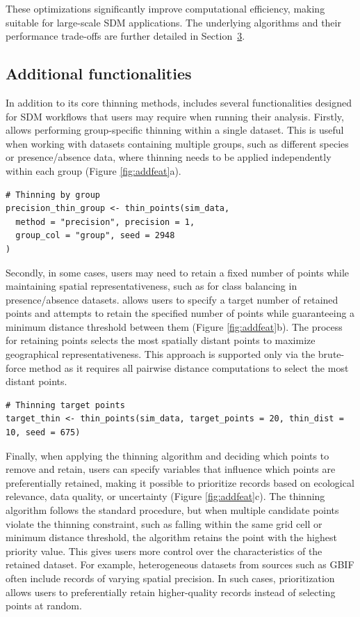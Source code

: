These optimizations significantly improve computational efficiency, making  suitable for large-scale SDM applications. The underlying algorithms and their performance trade-offs are further detailed in Section~\hyperref[modifiedthinning]{3}.

\subsection{Additional functionalities}\label{additional-functionalities}

In addition to its core thinning methods,  includes several functionalities designed for SDM workflows that users may require when running their analysis. Firstly,  allows performing group-specific thinning within a single dataset. This is useful when working with datasets containing multiple groups, such as different species or presence/absence data, where thinning needs to be applied independently within each group (Figure \ref{fig:addfeat}a).

\begin{verbatim}
# Thinning by group
precision_thin_group <- thin_points(sim_data,
  method = "precision", precision = 1,
  group_col = "group", seed = 2948
)
\end{verbatim}

Secondly, in some cases, users may need to retain a fixed number of points while maintaining spatial representativeness, such as for class balancing in presence/absence datasets.  allows users to specify a target number of retained points and attempts to retain the specified number of points while guaranteeing a minimum distance threshold between them (Figure \ref{fig:addfeat}b). The process for retaining points selects the most spatially distant points to maximize geographical representativeness. This approach is supported only via the brute-force method as it requires all pairwise distance computations to select the most distant points.

\begin{verbatim}
# Thinning target points
target_thin <- thin_points(sim_data, target_points = 20, thin_dist = 10, seed = 675)
\end{verbatim}

Finally, when applying the thinning algorithm and deciding which points to remove and retain, users can specify variables that influence which points are preferentially retained, making it possible to prioritize records based on ecological relevance, data quality, or uncertainty (Figure \ref{fig:addfeat}c). The thinning algorithm follows the standard procedure, but when multiple candidate points violate the thinning constraint, such as falling within the same grid cell or minimum distance threshold, the algorithm retains the point with the highest priority value. This gives users more control over the characteristics of the retained dataset. For example, heterogeneous datasets from sources such as GBIF often include records of varying spatial precision. In such cases, prioritization allows users to preferentially retain higher-quality records instead of selecting points at random.

